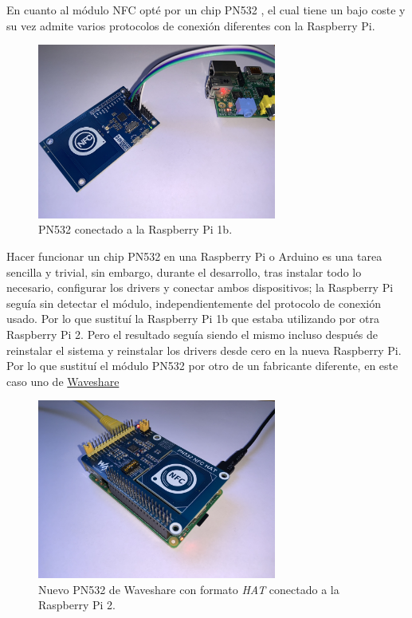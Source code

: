 En cuanto al módulo NFC opté por un chip PN532 \cite{raspberry-pn532}, el cual
tiene un bajo coste y su vez admite varios protocolos de conexión diferentes con
la Raspberry Pi.

\begin{figure}[H]
    \centering
    \includegraphics[width=0.7\textwidth]{fotos/pn532_bad.jpeg}
    \caption{PN532 conectado a la Raspberry Pi 1b.}
\end{figure}

Hacer funcionar un chip PN532 en una Raspberry Pi o Arduino es una tarea
sencilla y trivial, sin embargo, durante el desarrollo, tras instalar todo lo
necesario, configurar los drivers y conectar ambos dispositivos; la Raspberry Pi
seguía sin detectar el módulo, independientemente del protocolo de conexión
usado. Por lo que sustituí la Raspberry Pi 1b que estaba utilizando por otra
Raspberry Pi 2. 
Pero el resultado seguía siendo el mismo incluso después de reinstalar el
sistema y reinstalar los drivers desde cero en la nueva Raspberry Pi. Por lo que
sustituí el módulo PN532 por otro de un fabricante diferente, en este caso uno de
\href{https://www.waveshare.com/wiki/PN532_NFC_HAT}{Waveshare}

\begin{figure}[hb]
    \centering
    \includegraphics[width=0.7\textwidth]{fotos/pn532_good.jpeg}
    \caption{Nuevo PN532 de Waveshare con formato \emph{HAT} conectado a la Raspberry Pi 2.}
\end{figure}

